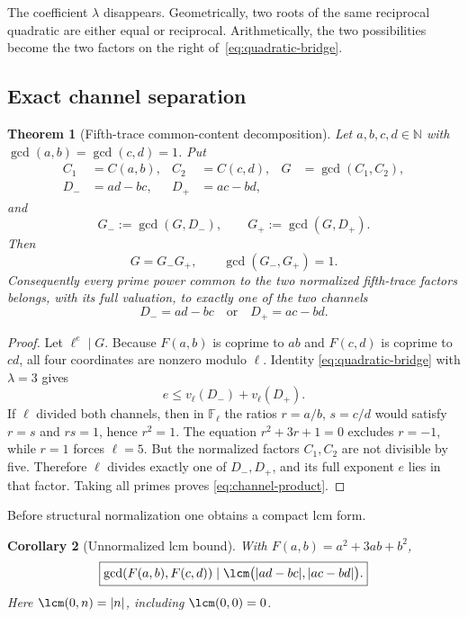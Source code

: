 \documentclass[11pt,oneside]{article}
\newtheorem{theorem}{Theorem}[section]
\newtheorem{corollary}[theorem]{Corollary}
\theoremstyle{definition}
\theoremstyle{remark}
\newcommand{\N}{\mathbb N}
\begin{document}
The coefficient \(\lambda\) disappears.  Geometrically, two roots of the same reciprocal
quadratic are either equal or reciprocal.  Arithmetically, the two possibilities become the
two factors on the right of~\eqref{eq:quadratic-bridge}.

\subsection{Exact channel separation}

\begin{theorem}[Fifth-trace common-content decomposition]
\label{thm:T5-channel-decomposition}
Let \(a,b,c,d\in\N\) with \(\gcd(a,b)=\gcd(c,d)=1\).  Put
\begin{align}
 C_1&=C(a,b),& C_2&=C(c,d),&G&=\gcd(C_1,C_2),\label{eq:channel-G}\\
 D_-&=ad-bc,&D_+&=ac-bd,\label{eq:channel-D}
\end{align}
and
\begin{equation}
 G_-:=\gcd(G,D_-),
 \qquad
 G_+:=\gcd(G,D_+).
 \label{eq:Gpm}
\end{equation}
Then
\begin{equation}
 \boxed{G=G_-G_+,\qquad\gcd(G_-,G_+)=1.}
 \label{eq:channel-product}
\end{equation}
Consequently every prime power common to the two normalized fifth-trace factors belongs, with
its full valuation, to exactly one of the two channels
\[
 D_-=ad-bc\quad\text{or}\quad D_+=ac-bd.
\]
\end{theorem}

\begin{proof}
Let \(\ell^e\mid G\).  Because \(F(a,b)\) is coprime to \(ab\) and \(F(c,d)\) is
coprime to \(cd\), all four coordinates are nonzero modulo \(\ell\).  Identity
\eqref{eq:quadratic-bridge} with \(\lambda=3\) gives
\[
 e\le v_\ell(D_-)+v_\ell(D_+).
\]
If \(\ell\) divided both channels, then in \(\mathbb F_\ell\) the ratios
\(r=a/b\), \(s=c/d\) would satisfy \(r=s\) and \(rs=1\), hence \(r^2=1\).  The equation
\(r^2+3r+1=0\) excludes \(r=-1\), while \(r=1\) forces \(\ell=5\).  But the normalized
factors \(C_1,C_2\) are not divisible by five.  Therefore \(\ell\) divides exactly one of
\(D_-,D_+\), and its full exponent \(e\) lies in that factor.  Taking all primes proves
\eqref{eq:channel-product}.
\end{proof}

Before structural normalization one obtains a compact lcm form.

\begin{corollary}[Unnormalized lcm bound]
\label{cor:T5-lcm}
With \(F(a,b)=a^2+3ab+b^2\),
\begin{equation}
 \boxed{
 \gcd(F(a,b),F(c,d))
 \mid\lcm\bigl(|ad-bc|,|ac-bd|\bigr).}
 \label{eq:T5-lcm}
\end{equation}
Here \(\lcm(0,n)=|n|\), including \(\lcm(0,0)=0\).
\end{corollary}
\end{document}

